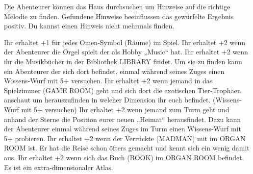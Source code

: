 Die Abenteurer können das Haus durchsuchen um Hinweise auf die richtige Melodie zu finden. Gefundene Hinweise beeinflussen das gewürfelte Ergebnis positiv. Du kannst einen Hinweis nicht mehrmals finden.
  \begin{itemize}
    \bitem Ihr erhaltet +1 für jedes Omen-Symbol (Räume) im Spiel.
    \bitem Ihr erhaltet +2 wenn der Abenteurer die Orgel spielt der als Hobby „Music“ hat.
    \bitem Ihr erhaltet +2 wenn ihr die Musikbücher in der Bibliothek LIBRARY findet. Um sie zu finden kann ein Abenteurer der sich dort befindet, einmal während seines Zuges einen Wissens-Wurf mit 5+ versuchen.
    \bitem Ihr erhaltet +2 wenn jemand in das Spielzimmer (GAME ROOM) geht und sich dort die exotischen Tier-Trophäen anschaut um herauszufinden in welcher Dimension ihr euch befindet.
        (Wissens-Wurf mit 5+ versuchen)
    \bitem Ihr erhaltet +2 wenn jemand zum Turm geht und anhand der Sterne die Position eurer neuen „Heimat“ herausfindet. Dazu kann der Abenteurer einmal während seines Zuges im Turm einen Wissens-Wurf mit 5+ probieren.
    \bitem Ihr erhaltet +2 wenn der Verrückte (MADMAN) mit im ORGAN ROOM ist. Er hat die Reise schon öfters gemacht und kennt sich ein wenig damit aus.
    \bitem Ihr erhaltet +2 wenn sich das Buch (BOOK) im ORGAN ROOM befindet. Es ist ein extra-dimensionaler Atlas.
    \end{itemize}



